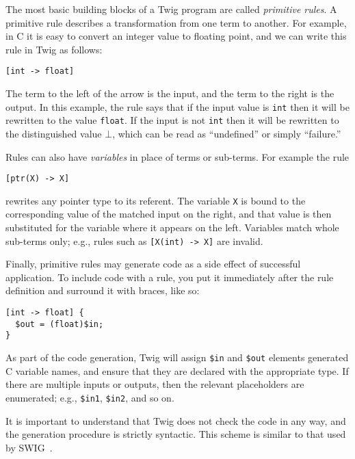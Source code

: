 
The most basic building blocks of a Twig program are called \emph{primitive rules}. A primitive rule describes a transformation from one term to another. For example, in C it is easy to convert an integer value to floating point, and we can write this rule in Twig as follows:

\begin{verbatim}
[int -> float]
\end{verbatim}

The term to the left of the arrow is the input, and the term to the right is the output. In this example, the rule says that if the input value is \texttt{int} then it will be rewritten to the value \texttt{float}. If the input is not \texttt{int} then it will be rewritten to the distinguished value $\bot$, which can be read as ``undefined'' or simply ``failure.''

Rules can also have \emph{variables} in place of terms or sub-terms. For example the rule

\begin{verbatim}
[ptr(X) -> X]
\end{verbatim}

rewrites any pointer type to its referent. The variable \texttt{X} is bound to the corresponding value of the matched input on the right, and that value is then substituted for the variable where it appears on the left. Variables match whole sub-terms only; e.g., rules such as \texttt{[X(int) -> X]} are invalid.

Finally, primitive rules may generate code as a side effect of successful application. To include code with a rule, you put it immediately after the rule definition and surround it with braces, like so:

\begin{verbatim}
[int -> float] {
  $out = (float)$in;
}
\end{verbatim}

As part of the code generation, Twig will assign \texttt{\$in} and \texttt{\$out} elements generated C variable names, and ensure that they are declared with the appropriate type. If there are multiple inputs or outputs, then the relevant placeholders are enumerated; e.g., \texttt{\$in1}, \texttt{\$in2}, and so on.

It is important to understand that Twig does not check the code in any way, and the generation procedure is strictly syntactic. This scheme is similar to that used by SWIG~\cite{swig}.

